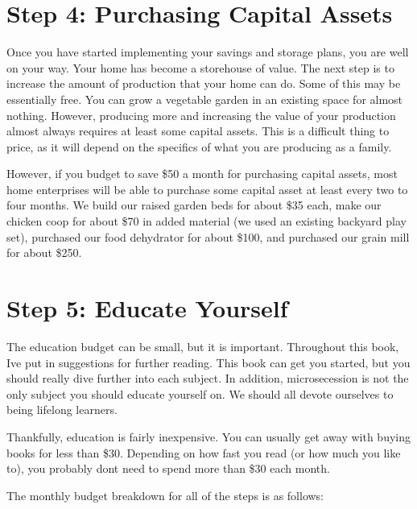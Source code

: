\documentclass[letterpaper]{article}
\begin{document}
\section{Step 4: Purchasing Capital Assets}
{\color{black}
Once you have started implementing your savings and storage plans, you
are well on your way. Your home has become a storehouse of value. The
next step is to increase the amount of production that your home can
do. Some of this may be essentially free. You can grow a vegetable
garden in an existing space for almost nothing. However, producing more
and increasing the value of your production almost always requires at
least some capital assets. This is a difficult thing to price, as it
will depend on the specifics of what you are producing as a family.}

{\color{black}
However, if you budget to save \$50 a month for purchasing capital
assets, most home enterprises will be able to purchase some capital
asset at least every two to four months. We build our raised garden
beds for about \$35 each, make our chicken coop for about \$70 in added
material (we used an existing backyard play set), purchased our food
dehydrator for about \$100, and purchased our grain mill for about
\$250. }

\section[Step 5: Educate Yourself]{Step 5: Educate Yourself}
{\color{black}
The education budget can be small, but it is important. Throughout this
book, I{\textquotesingle}ve put in suggestions for further reading.
This book can get you started, but you should really dive further into
each subject. In addition, microsecession is not the only subject you
should educate yourself on. We should all devote ourselves to being
lifelong learners.}

{\color{black}
Thankfully, education is fairly inexpensive. You can usually get away
with buying books for less than \$30. Depending on how fast you read
(or how much you like to), you probably don{\textquotesingle}t need to
spend more than \$30 each month. }

{\color{black}
The monthly budget breakdown for all of the steps is as follows:}
\end{document}
